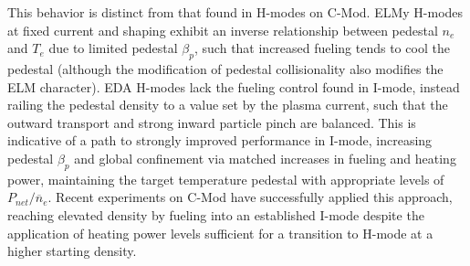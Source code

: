 This behavior is distinct from that found in H-modes on C-Mod.  ELMy H-modes at fixed current and shaping exhibit an inverse relationship between pedestal $n_e$ and $T_e$ due to limited pedestal $\beta_p$, such that increased fueling tends to cool the pedestal (although the modification of pedestal collisionality also modifies the ELM character).  EDA H-modes lack the fueling control found in I-mode, instead railing the pedestal density to a value set by the plasma current, such that the outward transport and strong inward particle pinch are balanced.  This is indicative of a path to strongly improved performance in I-mode, increasing pedestal $\beta_p$ and global confinement via matched increases in fueling and heating power, maintaining the target temperature pedestal with appropriate levels of $P_{net}/\overline{n}_e$.  Recent experiments on C-Mod \cite{Hubbard2012} have successfully applied this approach, reaching elevated density by fueling into an established I-mode despite the application of heating power levels sufficient for a transition to H-mode at a higher starting density.

\begin{figure}[ht]
 \pushtooutside
\end{figure}

